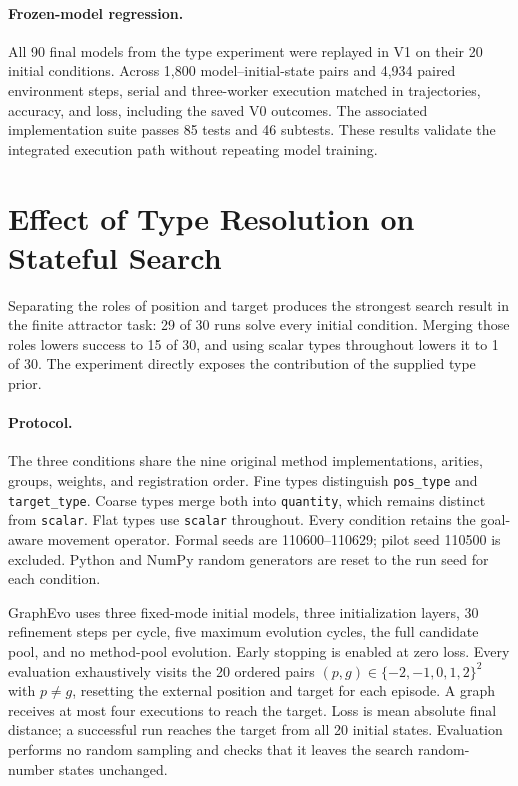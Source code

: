 \paragraph{Frozen-model regression.}
All 90 final models from the type experiment were replayed in V1 on their 20
initial conditions. Across 1,800 model--initial-state pairs and 4,934 paired
environment steps, serial and three-worker execution matched in trajectories,
accuracy, and loss, including the saved V0 outcomes. The associated implementation
suite passes 85 tests and 46 subtests. These results validate the integrated
execution path without repeating model training.

\section{Effect of Type Resolution on Stateful Search}
\label{app:revision_types}

Separating the roles of position and target produces the strongest search result
in the finite attractor task: 29 of 30 runs solve every initial condition.
Merging those roles lowers success to 15 of 30, and using scalar types throughout
lowers it to 1 of 30. The experiment directly exposes the contribution of the
supplied type prior.

\paragraph{Protocol.}
The three conditions share the nine original method implementations, arities,
groups, weights, and registration order. Fine types distinguish
\texttt{pos\_type} and \texttt{target\_type}. Coarse types merge both into
\texttt{quantity}, which remains distinct from \texttt{scalar}. Flat types use
\texttt{scalar} throughout. Every condition retains the goal-aware movement
operator. Formal seeds are 110600--110629; pilot seed 110500 is excluded.
Python and NumPy random generators are reset to the run seed for each condition.

GraphEvo uses three fixed-mode initial models, three initialization layers,
30 refinement steps per cycle, five maximum evolution cycles, the full
candidate pool, and no method-pool evolution. Early stopping is enabled at zero
loss. Every evaluation exhaustively visits the 20 ordered pairs
$(p,g)\in\{-2,-1,0,1,2\}^2$ with $p\ne g$, resetting the external position and
target for each episode. A graph receives at most four executions to reach the
target. Loss is mean absolute final distance; a successful run reaches the
target from all 20 initial states. Evaluation performs no random sampling and
checks that it leaves the search random-number states unchanged.

